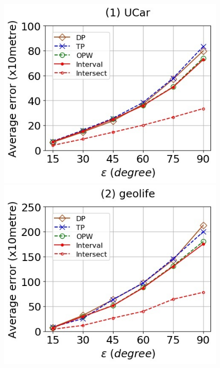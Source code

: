 \begin{figure}[tb!]
	\centering
	\includegraphics[scale = 0.400]{Figures/Exp-when-DAD-error-epsilon-service.jpg}\hspace{2ex}
	\includegraphics[scale = 0.400]{Figures/Exp-when-DAD-error-epsilon-geolife.jpg}\hspace{2ex}

\end{figure}
